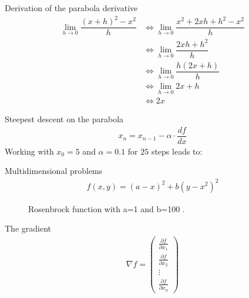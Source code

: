 \documentclass{beamer}
\begin{document}
    \begin{frame}{Derivation of the parabola derivative}
      \begin{align}
          \lim_{h \rightarrow 0} \dfrac{(x + h)^2 - x^2}{h} 
          & \Leftrightarrow \lim_{h \rightarrow 0} \dfrac{x^2 + 2xh + h^2 - x^2}{h}   \\
          & \Leftrightarrow \lim_{h \rightarrow 0} \dfrac{2xh + h^2}{h}  \\
          & \Leftrightarrow \lim_{h \rightarrow 0} \dfrac{h (2x + h)}{h}  \\
          & \Leftrightarrow \lim_{h \rightarrow 0} 2x + h \\
          & \Leftrightarrow 2x
      \end{align}
    \end{frame}

    \begin{frame}{Steepest descent on the parabola}
      \begin{align}
        x_n = x_{n-1} - \alpha \cdot \dfrac{d f}{dx}
      \end{align}
      Working with $x_0 = 5$ and $\alpha = 0.1$ for $25$ steps leads to: 
      \begin{figure}
        
      \end{figure}
    \end{frame}

    \begin{frame}{Multidimensional problems}
      \begin{align}
        f(x, y) = (a - x)^2 + b(y - x^2)^2
      \end{align}
      \begin{figure}
        
        \caption{Rosenbrock function with a=1 and b=100 .}
      \end{figure}
    \end{frame}

    \begin{frame}{The gradient}
      \begin{align}
        \nabla f = \begin{pmatrix}
          \frac{\partial f}{\partial x_1} \\
          \frac{\partial f}{\partial x_2} \\
          \vdots \\
          \frac{\partial f}{\partial x_n}
        \end{pmatrix}
      \end{align}
    \end{frame}
\end{document}
